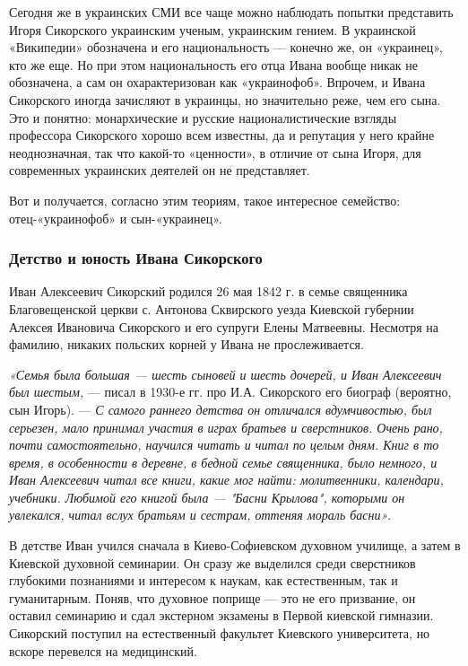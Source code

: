 Сегодня же в украинских СМИ все чаще можно наблюдать попытки представить Игоря
Сикорского украинским ученым, украинским гением. В украинской «Википедии»
обозначена и его национальность — конечно же, он «украинец», кто же еще. Но при
этом национальность его отца Ивана вообще никак не обозначена, а сам он
охарактеризован как «украинофоб». Впрочем, и Ивана Сикорского иногда зачисляют
в украинцы, но значительно реже, чем его сына. Это и понятно: монархические и
русские националистические взгляды профессора Сикорского хорошо всем известны,
да и репутация у него крайне неоднозначная, так что какой-то «ценности», в
отличие от сына Игоря, для современных украинских деятелей он не представляет.

Вот и получается, согласно этим теориям, такое интересное семейство:
отец-«украинофоб» и сын-«украинец».


\subsubsection{Детство и юность Ивана Сикорского}

Иван Алексеевич Сикорский родился 26 мая 1842 г. в семье священника
Благовещенской церкви с. Антонова Сквирского уезда Киевской губернии Алексея
Ивановича Сикорского и его супруги Елены Матвеевны. Несмотря на фамилию,
никаких польских корней у Ивана не прослеживается. 

\emph{«Семья была большая — шесть сыновей и шесть дочерей, и Иван Алексеевич был
шестым,} — писал в 1930-е гг. про И.А. Сикорского его биограф (вероятно, сын
Игорь). — \emph{С самого раннего детства он отличался вдумчивостью, был серьезен,
мало принимал участия в играх братьев и сверстников. Очень рано, почти
самостоятельно, научился читать и читал по целым дням. Книг в то время, в
особенности в деревне, в бедной семье священника, было немного, и Иван
Алексеевич читал все книги, какие мог найти: молитвенники, календари, учебники.
Любимой его книгой была — "Басни Крылова", которыми он увлекался, читал вслух
братьям и сестрам, оттеняя мораль басни»}.

В детстве Иван учился сначала в Киево-Софиевском духовном училище, а затем в
Киевской духовной семинарии. Он сразу же выделился среди сверстников глубокими
познаниями и интересом к наукам, как естественным, так и гуманитарным. Поняв,
что духовное поприще — это не его призвание, он оставил семинарию и сдал
экстерном экзамены в Первой киевской гимназии. Сикорский поступил на
естественный факультет Киевского университета, но вскоре перевелся на
медицинский.

